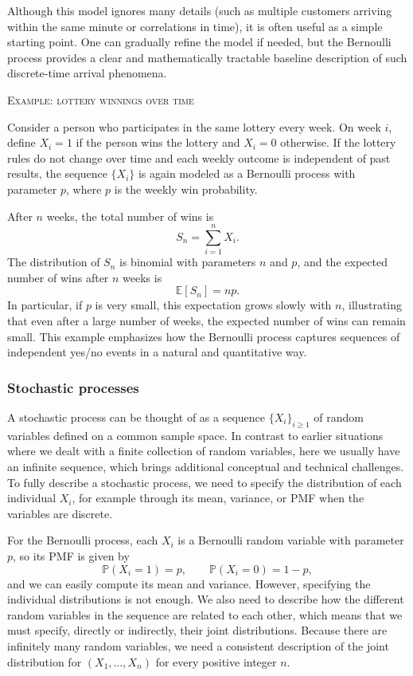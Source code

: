 Although this model ignores many details (such as multiple customers arriving within the same minute or correlations in time), it is often useful as a simple starting point.  
One can gradually refine the model if needed, but the Bernoulli process provides a clear and mathematically tractable baseline description of such discrete-time arrival phenomena.  

\bigskip
\textsc{Example: lottery winnings over time}

Consider a person who participates in the same lottery every week.  
On week \(i\), define \(X_i = 1\) if the person wins the lottery and \(X_i = 0\) otherwise.  
If the lottery rules do not change over time and each weekly outcome is independent of past results, the sequence \(\{X_i\}\) is again modeled as a Bernoulli process with parameter \(p\), where \(p\) is the weekly win probability.  

After \(n\) weeks, the total number of wins is
\[
S_n = \sum_{i=1}^{n} X_i.
\]
The distribution of \(S_n\) is binomial with parameters \(n\) and \(p\), and the expected number of wins after \(n\) weeks is
\[
\mathbb{E}[S_n] = np.
\]
In particular, if \(p\) is very small, this expectation grows slowly with \(n\), illustrating that even after a large number of weeks, the expected number of wins can remain small.  
This example emphasizes how the Bernoulli process captures sequences of independent yes/no events in a natural and quantitative way.


\subsubsection{Stochastic processes}

A stochastic process can be thought of as a sequence \(\{X_i\}_{i \geq 1}\) of random variables defined on a common sample space.  
In contrast to earlier situations where we dealt with a finite collection of random variables, here we usually have an infinite sequence, which brings additional conceptual and technical challenges.  
To fully describe a stochastic process, we need to specify the distribution of each individual \(X_i\), for example through its mean, variance, or PMF when the variables are discrete.  

For the Bernoulli process, each \(X_i\) is a Bernoulli random variable with parameter \(p\), so its PMF is given by
\[
\mathbb{P}(X_i = 1) = p,
\qquad
\mathbb{P}(X_i = 0) = 1 - p,
\]
and we can easily compute its mean and variance.  
However, specifying the individual distributions is not enough.  
We also need to describe how the different random variables in the sequence are related to each other, which means that we must specify, directly or indirectly, their joint distributions.  
Because there are infinitely many random variables, we need a consistent description of the joint distribution for \((X_1,\ldots,X_n)\) for every positive integer \(n\).  

